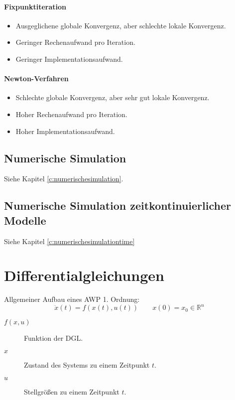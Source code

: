                 \paragraph{Fixpunktiteration}
	                \begin{itemize}
	                	\item Ausgeglichene globale Konvergenz, aber schlechte lokale Konvergenz.
	                	\item Geringer Rechenaufwand pro Iteration.
	                	\item Geringer Implementationsaufwand.
	                \end{itemize}
                
                \paragraph{Newton-Verfahren}
	                \begin{itemize}
	                	\item Schlechte globale Konvergenz, aber sehr gut lokale Konvergenz.
	                	\item Hoher Rechenaufwand pro Iteration.
	                	\item Hoher Implementationsaufwand.
	                \end{itemize}

	        \subsection{Numerische Simulation} %
		        Siehe Kapitel \ref{c:numerischesimulation}.
	        
	        \subsection{Numerische Simulation zeitkontinuierlicher Modelle} %
		        Siehe Kapitel \ref{c:numerischesimulationtime}

    \section{Differentialgleichungen} %
        Allgemeiner Aufbau eines AWP 1. Ordnung:
        \begin{equation*}
	        \dot{x}(t) = f(x(t), u(t)) \quad\quad x(0) = x _ 0 \in \mathbb{R} ^ n
        \end{equation*}
        \begin{description}
        	\item[\( f(x, u) \)] Funktion der DGL.
        	\item[\( x \)] Zustand des Systems zu einem Zeitpunkt \( t \).
        	\item[\( u \)] Stellgrößen zu einem Zeitpunkt \( t \).
        \end{description}
        
